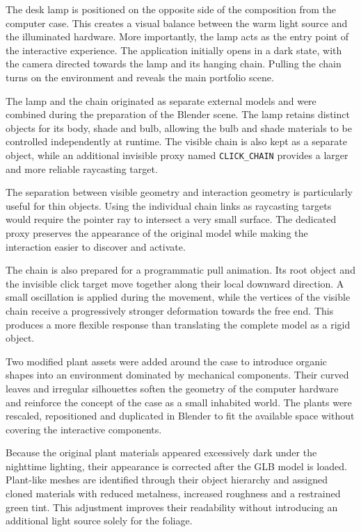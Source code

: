 \documentclass{report}
\begin{document}
The desk lamp is positioned on the opposite side of the composition from
the computer case. This creates a visual balance between the warm light
source and the illuminated hardware. More importantly, the lamp acts as
the entry point of the interactive experience. The application initially
opens in a dark state, with the camera directed towards the lamp and its
hanging chain. Pulling the chain turns on the environment and reveals the
main portfolio scene.

The lamp and the chain originated as separate external models and were
combined during the preparation of the Blender scene. The lamp retains
distinct objects for its body, shade and bulb, allowing the bulb and
shade materials to be controlled independently at runtime. The visible
chain is also kept as a separate object, while an additional invisible
proxy named \texttt{CLICK\_CHAIN} provides a larger and more reliable
raycasting target.

The separation between visible geometry and interaction geometry is
particularly useful for thin objects. Using the individual chain links
as raycasting targets would require the pointer ray to intersect a very
small surface. The dedicated proxy preserves the appearance of the
original model while making the interaction easier to discover and
activate.

The chain is also prepared for a programmatic pull animation. Its root
object and the invisible click target move together along their local
downward direction. A small oscillation is applied during the movement,
while the vertices of the visible chain receive a progressively stronger
deformation towards the free end. This produces a more flexible response
than translating the complete model as a rigid object.

Two modified plant assets were added around the case to introduce
organic shapes into an environment dominated by mechanical components.
Their curved leaves and irregular silhouettes soften the geometry of the
computer hardware and reinforce the concept of the case as a small
inhabited world. The plants were rescaled, repositioned and duplicated
in Blender to fit the available space without covering the interactive
components.

Because the original plant materials appeared excessively dark under the
nighttime lighting, their appearance is corrected after the GLB model is
loaded. Plant-like meshes are identified through their object hierarchy
and assigned cloned materials with reduced metalness, increased
roughness and a restrained green tint. This adjustment improves their
readability without introducing an additional light source solely for
the foliage.
\end{document}
